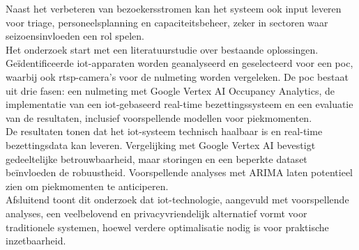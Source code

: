 Naast het verbeteren van bezoekersstromen kan het systeem ook input leveren voor triage, personeelsplanning en capaciteitsbeheer, zeker in sectoren waar seizoensinvloeden een rol spelen. \\

Het onderzoek start met een literatuurstudie over bestaande oplossingen. Geïdentificeerde \gls{iot}-apparaten worden geanalyseerd en geselecteerd voor een \gls{poc}, waarbij ook \gls{rtsp}-camera’s voor de nulmeting worden vergeleken. De \gls{poc} bestaat uit drie fasen: een nulmeting met Google Vertex AI Occupancy Analytics, de implementatie van een \gls{iot}-gebaseerd real-time bezettingssysteem en een evaluatie van de resultaten, inclusief voorspellende modellen voor piekmomenten. \\

De resultaten tonen dat het \gls{iot}-systeem technisch haalbaar is en real-time bezettingsdata kan leveren. Vergelijking met Google Vertex AI bevestigt gedeeltelijke betrouwbaarheid, maar storingen en een beperkte dataset beïnvloeden de robuustheid. Voorspellende analyses met ARIMA laten potentieel zien om piekmomenten te anticiperen. \\

Afsluitend toont dit onderzoek dat \gls{iot}-technologie, aangevuld met voorspellende analyses, een veelbelovend en privacyvriendelijk alternatief vormt voor traditionele systemen, hoewel verdere optimalisatie nodig is voor praktische inzetbaarheid.

